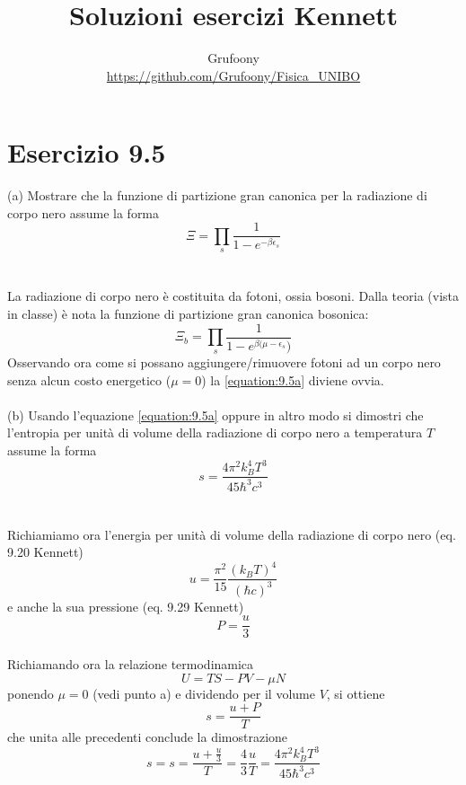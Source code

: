 \documentclass[a4paper]{article}
\begin{document}
	\title{Soluzioni esercizi Kennett}
	\author{Grufoony\\\url{https://github.com/Grufoony/Fisica_UNIBO}}
	\maketitle

    \section{Esercizio 9.5}
    (a) Mostrare che la funzione di partizione gran canonica per la radiazione di corpo nero assume la forma
    \begin{equation}
        \Xi=\prod_s\frac{1}{1-e^{-\beta\epsilon_s}}
        \label{equation:9.5a}
    \end{equation}
    \\
    \\
    La radiazione di corpo nero è costituita da fotoni, ossia bosoni.
    Dalla teoria (vista in classe) è nota la funzione di partizione gran canonica bosonica:
    \begin{equation*}
        \Xi_b=\prod_s\frac{1}{1-e^{\beta(\mu-\epsilon_s})}
    \end{equation*}
    Osservando ora come si possano aggiungere/rimuovere fotoni ad un corpo nero senza alcun costo energetico ($\mu=0$) la \ref{equation:9.5a} diviene ovvia.
    \\
    \\
    (b) Usando l'equazione \ref{equation:9.5a} oppure in altro modo si dimostri che l'entropia per unità di volume della radiazione di corpo nero a temperatura $T$ assume la forma
    \begin{equation}
        s=\frac{4\pi^2k_B^4T^3}{45\hbar^3c^3}
    \end{equation}
    \\
    \\
    Richiamiamo ora l'energia per unità di volume della radiazione di corpo nero (eq. 9.20 Kennett)
    \begin{equation*}
        u=\frac{\pi^2}{15}\frac{(k_BT)^4}{(\hbar c)^3}
    \end{equation*}
    e anche la sua pressione (eq. 9.29 Kennett)
    \begin{equation*}
        P=\frac{u}{3}
    \end{equation*}
    \\
    Richiamando ora la relazione termodinamica
    \begin{equation}
        U=TS-PV-\mu N
    \end{equation}
    ponendo $\mu=0$ (vedi punto a) e dividendo per il volume $V$, si ottiene
    \begin{equation*}
        s=\frac{u+P}{T}
    \end{equation*}
    che unita alle precedenti conclude la dimostrazione
    \begin{equation*}
        s=s=\frac{u+\frac{u}{3}}{T}=\frac{4}{3}\frac{u}{T}=\frac{4\pi^2k_B^4T^3}{45\hbar^3c^3}
    \end{equation*}
\end{document}
